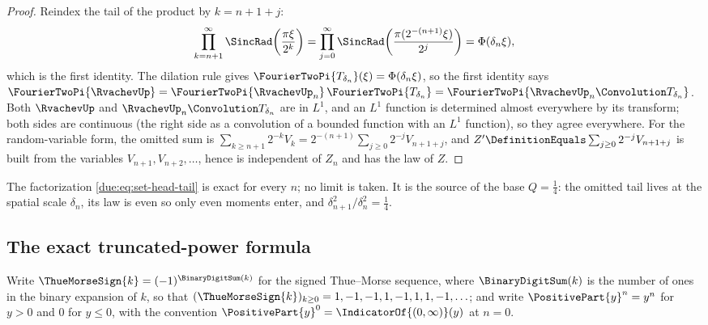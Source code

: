 \documentclass[11pt,oneside]{article}
\theoremstyle{plain}
\theoremstyle{definition}
\theoremstyle{remark}
\newcommand{\upn}[1]{\RvachevUp_{#1}}
\newcommand{\PhiUp}{\Phi}                                   %
\newcommand{\Qq}{Q}                                         %
\begin{document}
\begin{proof}
Reindex the tail of the product by $k=n+1+j$:
\[
 \prod_{k=n+1}^{\infty}\SincRad\!\left(\frac{\pi\xi}{2^{k}}\right)
 =\prod_{j=0}^{\infty}\SincRad\!\left(\frac{\pi(2^{-(n+1)}\xi)}{2^{j}}\right)
 =\PhiUp(\delta_n\xi),
\]
which is the first identity.  The dilation rule gives
$\FourierTwoPi{T_{\delta_n}}(\xi)=\PhiUp(\delta_n\xi)$, so the first identity
says $\FourierTwoPi{\RvachevUp}=\FourierTwoPi{\upn{n}}\,\FourierTwoPi{T_{\delta_n}}
=\FourierTwoPi{\upn{n}\Convolution T_{\delta_n}}$.  Both $\RvachevUp$ and
$\upn{n}\Convolution T_{\delta_n}$ are in $L^{1}$, and an $L^{1}$ function is
determined almost everywhere by its transform; both sides are continuous
(the right side as a convolution of a bounded function with an $L^{1}$
function), so they agree everywhere.  For the random-variable form, the
omitted sum is $\sum_{k\ge n+1}2^{-k}V_k=2^{-(n+1)}\sum_{j\ge0}2^{-j}V_{n+1+j}$,
and $Z'\DefinitionEquals\sum_{j\ge0}2^{-j}V_{n+1+j}$ is built from the
variables $V_{n+1},V_{n+2},\ldots$, hence is independent of $Z_n$ and has
the law of $Z$.
\end{proof}

The factorization \cref{due:eq:set-head-tail} is exact for every $n$; no
limit is taken.  It is the source of the base $\Qq=\frac14$: the omitted
tail lives at the spatial scale $\delta_n$, its law is even so only even
moments enter, and $\delta_{n+1}^{2}/\delta_n^{2}=\frac14$.

\subsection{The exact truncated-power formula}
\label{due:sec:set-truncated-power}

Write $\ThueMorseSign{k}=(-1)^{\BinaryDigitSum(k)}$ for the signed
Thue--Morse sequence, where $\BinaryDigitSum(k)$ is the number of ones in
the binary expansion of $k$, so that
$(\ThueMorseSign{k})_{k\ge0}=1,-1,-1,1,-1,1,1,-1,\ldots$; and write
$\PositivePart{y}^{n}=y^{n}$ for $y>0$ and $0$ for $y\le0$, with the
convention $\PositivePart{y}^{0}=\IndicatorOf{(0,\infty)}(y)$ at $n=0$.
\end{document}
